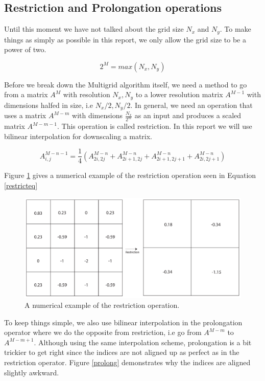\subsection{Restriction and Prolongation operations}

Until this moment we have not talked about the grid size $N_x$ and $N_y$. To make things as simply as possible in this report, we only allow the grid size to be a power of two.

\begin{equation}
2^M = max(N_x, N_y)
\end{equation}

Before we break down the Multigrid algorithm itself, we need a method to go from a matrix $A^M$ with resolution $N_x,N_y$ to a lower resolution matrix $A^{M-1}$ with dimensions halfed in size, i.e $N_x/2,N_y/2$. In general, we need an operation that uses a matrix $A^{M-m}$ with dimensions $\frac{N_x}{2^m}$ as an input and produces a scaled matrix $A^{M-m-1}$. This operation is called restriction. In this report we will use bilinear interpolation for downscaling a matrix.

\begin{equation}
A^{M-n-1}_{i,j} = \frac{1}{4} ( A^{M-n}_{2i,2j} + A^{M-n}_{2i + 1,2j} + A^{M-n}_{2i + 1,2j +1 }  + A^{M-n}_{2i,2j + 1} )
\label{restricteq}
\end{equation}

Figure \ref {restrict} gives a numerical example of the restriction operation seen in Equation \ref{restricteq}

\begin{figure}[ht!]
\centering
\includegraphics[width=120mm]{img/restrict.pdf}
\caption{A numerical example of the restriction operation.}
\label{restrict}
\end{figure}

To keep things simple, we also use bilinear interpolation in the prolongation operator where we do the opposite from restriction, i.e go from $A^{M-m}$ to $A^{M-m+1}$. Although using the same interpolation scheme, prolongation is a bit trickier to get right since the indices are not aligned up as perfect as in the restriction operator. Figure \ref {prolong} demonstrates why the indices are aligned slightly awkward.

